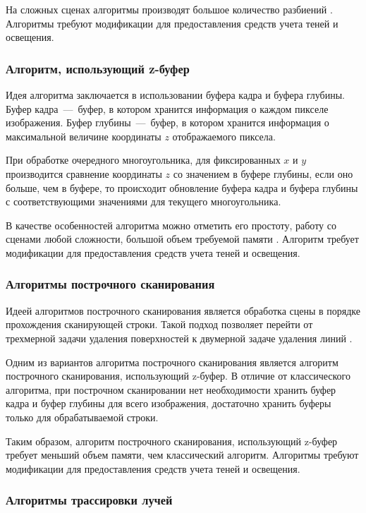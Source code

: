 На сложных сценах алгоритмы производят большое количество разбиений \cite{bib:8}. Алгоритмы требуют модификации для предоставления средств учета теней и освещения.

\subsubsection{Алгоритм, использующий z-буфер}

Идея алгоритма заключается в использовании буфера кадра и буфера глубины. Буфер кадра~---~буфер, в котором хранится информация о каждом пикселе изображения. Буфер глубины~---~буфер, в котором хранится информация о максимальной величине координаты $z$ отображаемого пиксела.

При обработке очередного многоугольника, для фиксированных $x$ и $y$ производится сравнение координаты $z$ со значением в буфере глубины, если оно больше, чем в буфере, то происходит обновление буфера кадра и буфера глубины с соответствующими значениями для текущего многоугольника.

В качестве особенностей алгоритма можно отметить его простоту, работу со сценами любой сложности, большой объем требуемой памяти \cite{bib:11}. Алгоритм требует модификации для предоставления средств учета теней и освещения.

\subsubsection{Алгоритмы построчного сканирования}

Идеей алгоритмов построчного сканирования является обработка сцены в порядке прохождения сканирующей строки. Такой подход позволяет перейти от трехмерной задачи удаления поверхностей к двумерной задаче удаления линий \cite{bib:12}.

Одним из вариантов алгоритма построчного сканирования является алгоритм построчного сканирования, использующий z-буфер. В отличие от классического алгоритма, при построчном сканировании нет необходимости хранить буфер кадра и буфер глубины для всего изображения, достаточно хранить буферы только для обрабатываемой строки. 

Таким образом, алгоритм построчного сканирования, использующий z-буфер требует меньший объем памяти, чем классический алгоритм. Алгоритмы требуют модификации для предоставления средств учета теней и освещения.


\subsubsection{Алгоритмы трассировки лучей}

